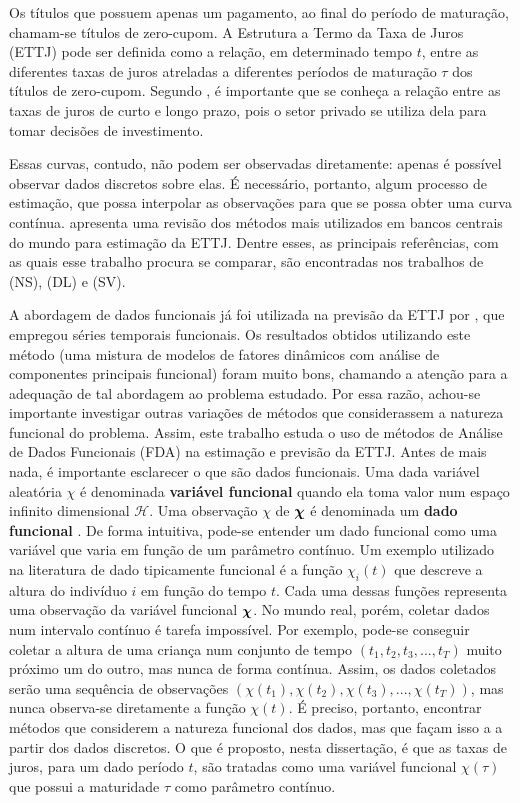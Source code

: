 \documentclass[
	12pt,				%
	openright,			%
	oneside,			%
	a4paper,			%
	english,			%
	brazil				%
	]{dissertacao-ufrgs-abntex2}
\begin{document}
Os títulos que possuem apenas um pagamento, ao final do período de
maturação, chamam-se títulos de zero-cupom. A Estrutura a Termo da
Taxa de Juros (ETTJ) pode ser definida como a relação, em determinado tempo $t$, entre as diferentes taxas de juros atreladas
a diferentes períodos de maturação $\tau$ dos títulos de zero-cupom.
Segundo , é importante que se conheça a relação
entre as taxas de juros de curto e longo prazo, pois o setor privado
se utiliza dela para tomar decisões de investimento.

Essas curvas, contudo, não podem ser observadas diretamente: apenas é possível observar dados discretos sobre elas. É necessário, portanto, algum
processo de estimação, que possa interpolar as observações para que
se possa obter uma curva contínua.   apresenta
uma revisão dos métodos mais utilizados em bancos centrais do mundo
para estimação da ETTJ. Dentre esses, as principais referências, com
as quais esse trabalho procura se comparar, são encontradas nos trabalhos 
de (NS), 
(DL) e (SV).


A abordagem de dados funcionais já foi utilizada na previsão da ETTJ por , que empregou séries temporais funcionais. Os resultados obtidos utilizando este método (uma mistura de modelos de fatores dinâmicos com análise de componentes principais funcional) foram muito bons, chamando a atenção para a adequação de tal abordagem ao problema estudado. Por essa razão, achou-se importante investigar outras variações de métodos que considerassem a natureza funcional do problema. 
Assim, este trabalho estuda o uso de métodos de Análise de Dados Funcionais (FDA) na estimação e previsão da ETTJ. Antes de mais nada, é importante esclarecer o que são dados funcionais. 
Uma dada variável aleatória $\chi$ é denominada \textbf{variável
funcional }quando ela toma valor num espaço infinito dimensional $\mathcal{H}$.
Uma observação $\chi$ de $\mathcal{\boldsymbol{\chi}}$ é denominada um \textbf{dado
funcional} \cite{vieu_nonparametric_2006}.
De forma intuitiva, pode-se entender um dado funcional como uma variável
que varia em função de um parâmetro contínuo. Um exemplo utilizado
na literatura de dado tipicamente funcional é a função $\chi_{i}(t)$
que descreve a altura do indivíduo $i$ em função do tempo $t$. Cada
uma dessas funções representa uma observação da variável funcional
$\boldsymbol{\chi}$. 
No mundo real, porém, coletar dados num intervalo contínuo é tarefa
impossível. Por exemplo, pode-se conseguir coletar a altura de uma
criança num conjunto de tempo $(t_{1},t_{2},t_{3},...,t_{T})$ muito
próximo um do outro, mas nunca de forma contínua. Assim, os dados coletados serão 
uma sequência de observações $(\chi(t_{1}),\chi(t_{2}),\chi(t_{3}),...,\chi(t_{T}))$,
mas nunca observa-se diretamente a função $\chi(t)$. É preciso, portanto, encontrar
métodos que considerem a natureza funcional dos dados, mas que façam isso a a partir dos dados discretos.
O que é proposto, nesta dissertação, é que as taxas de juros, para um dado período $t$, são tratadas como uma variável funcional $\chi(\tau)$ que possui a maturidade $\tau$ como parâmetro contínuo.
\end{document}
